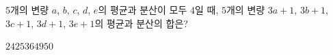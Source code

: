 $5$개의 변량 $a$, $b$, $c$, $d$, $e$의 평균과 분산이 모두 $4$일 때, $5$개의 변량 $3a+1$, $3b+1$, $3c+1$, $3d+1$, $3e+1$의 평균과 분산의 합은?
\begin{choices32}{$24$}{$25$}{$36$}{$49$}{$50$}\end{choices32}
